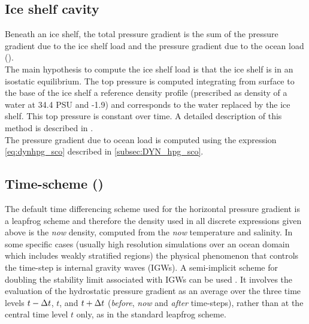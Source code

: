 \documentclass[../main/NEMO_manual]{subfiles}
\begin{document}
\subsection{Ice shelf cavity}
\label{subsec:DYN_hpg_isf}
Beneath an ice shelf, the total pressure gradient is the sum of the pressure gradient due to the ice shelf load and
the pressure gradient due to the ocean load ().\\

The main hypothesis to compute the ice shelf load is that the ice shelf is in an isostatic equilibrium.
The top pressure is computed integrating from surface to the base of the ice shelf a reference density profile
(prescribed as density of a water at 34.4 PSU and -1.9) and
corresponds to the water replaced by the ice shelf.
This top pressure is constant over time.
A detailed description of this method is described in \citet{Losch2008}.\\

The pressure gradient due to ocean load is computed using the expression \autoref{eq:dynhpg_sco} described in
\autoref{subsec:DYN_hpg_sco}. 

\subsection{Time-scheme (\protect{})}
\label{subsec:DYN_hpg_imp}

The default time differencing scheme used for the horizontal pressure gradient is a leapfrog scheme and
therefore the density used in all discrete expressions given above is the  \textit{now} density,
computed from the \textit{now} temperature and salinity.
In some specific cases
(usually high resolution simulations over an ocean domain which includes weakly stratified regions)
the physical phenomenon that controls the time-step is internal gravity waves (IGWs).
A semi-implicit scheme for doubling the stability limit associated with IGWs can be used
\citep{Brown_Campana_MWR78, Maltrud1998}.
It involves the evaluation of the hydrostatic pressure gradient as
an average over the three time levels $t-\Delta t$, $t$, and $t+\Delta t$
(\ie \textit{before}, \textit{now} and  \textit{after} time-steps),
rather than at the central time level $t$ only, as in the standard leapfrog scheme. 
\end{document}
